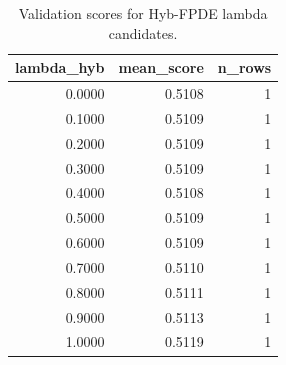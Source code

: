 \begin{table}[t]
\caption{Validation scores for Hyb-FPDE lambda candidates.}
\label{tab:lambda_distribution_computed}
\centering
\begin{tabular}{rrr}
\toprule
lambda\_hyb & mean\_score & n\_rows \\
\midrule
0.0000 & 0.5108 & 1 \\
0.1000 & 0.5109 & 1 \\
0.2000 & 0.5109 & 1 \\
0.3000 & 0.5109 & 1 \\
0.4000 & 0.5108 & 1 \\
0.5000 & 0.5109 & 1 \\
0.6000 & 0.5109 & 1 \\
0.7000 & 0.5110 & 1 \\
0.8000 & 0.5111 & 1 \\
0.9000 & 0.5113 & 1 \\
1.0000 & 0.5119 & 1 \\
\bottomrule
\end{tabular}

\end{table}
